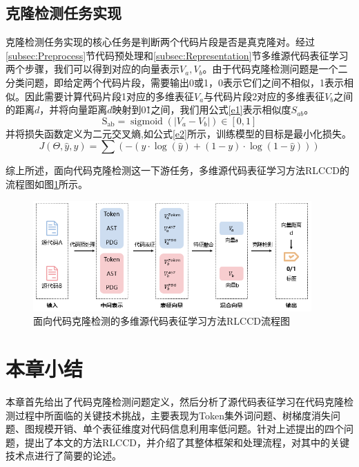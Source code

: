 \subsection{克隆检测任务实现}
\label{subsec:Clone detection}
克隆检测任务实现的核心任务是判断两个代码片段是否是真克隆对。经过\ref{subsec:Preprocess}节代码预处理和\ref{subsec:Representation}节多维源代码表征学习两个步骤，我们可以得到对应的向量表示$V_{a},V_{b}$。由于代码克隆检测问题是一个二分类问题，即给定两个代码片段，需要输出0或1，0表示它们之间不相似，1表示相似。因此需要计算代码片段1对应的多维表征$V_{a}$与代码片段2对应的多维表征$V_{b}$之间的距离$d$，并将向量距离$d$映射到0\~1之间，我们用公式\ref{e1}表示相似度$S_{ab}$。
\begin{equation}\label{e1}
    \mathrm{S_{ab}}=\operatorname{sigmoid}\left(\left|V_{a}-V_{b}\right|\right) \in[0,1]
\end{equation}
并将损失函数定义为二元交叉熵,如公式\ref{e2}所示，训练模型的目标是最小化损失。
\begin{equation}\label{e2}
    J(\Theta, \hat{y}, y)=\sum(-(y \cdot \log (\hat{y})+(1-y) \cdot \log (1-\hat{y})))
\end{equation}

综上所述，面向代码克隆检测这一下游任务，多维源代码表征学习方法RLCCD的流程图如图\ref{fig:detection}所示。
\begin{figure}[H]
    \centering
    \includegraphics[width=0.95\textwidth]{figures/detection}
    \caption{面向代码克隆检测的多维源代码表征学习方法RLCCD流程图}
    \label{fig:detection}
\end{figure}

\section{本章小结}
\label{sec:Summary2}
本章首先给出了代码克隆检测问题定义，然后分析了源代码表征学习在代码克隆检测过程中所面临的关键技术挑战，主要表现为Token集外词问题、树梯度消失问题、图规模开销、单个表征维度对代码信息利用率低问题。针对上述提出的四个问题，提出了本文的方法RLCCD，并介绍了其整体框架和处理流程，对其中的关键技术点进行了简要的论述。
